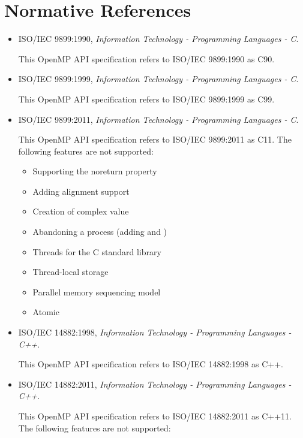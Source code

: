 \section{Normative References}
\label{sec:normative references}
\begin{itemize}
\item ISO/IEC 9899:1990, \textsl{Information Technology - Programming Languages - C}.

This OpenMP API specification refers to ISO/IEC 9899:1990 as C90.

\item ISO/IEC 9899:1999, \textsl{Information Technology - Programming Languages - C}. 

This OpenMP API specification refers to ISO/IEC 9899:1999 as C99.

\item ISO/IEC 9899:2011, \textsl{Information Technology - Programming Languages - C}. 

This OpenMP API specification refers to ISO/IEC 9899:2011 as C11. The
following features are not supported:

\begin{itemize}
\item Supporting the noreturn property
\item Adding alignment support
\item Creation of complex value
\item Abandoning a process (adding  and )
\item Threads for the C standard library
\item Thread-local storage
\item Parallel memory sequencing model
\item Atomic
\end{itemize}

\item ISO/IEC 14882:1998, \textsl{Information Technology - Programming Languages - C++}. 

This OpenMP API specification refers to ISO/IEC 14882:1998 as C++.

\item ISO/IEC 14882:2011, \textsl{Information Technology - Programming Languages - C++}. 

This OpenMP API specification refers to ISO/IEC 14882:2011 as
C++11. The following features are not supported:


\end{itemize}
